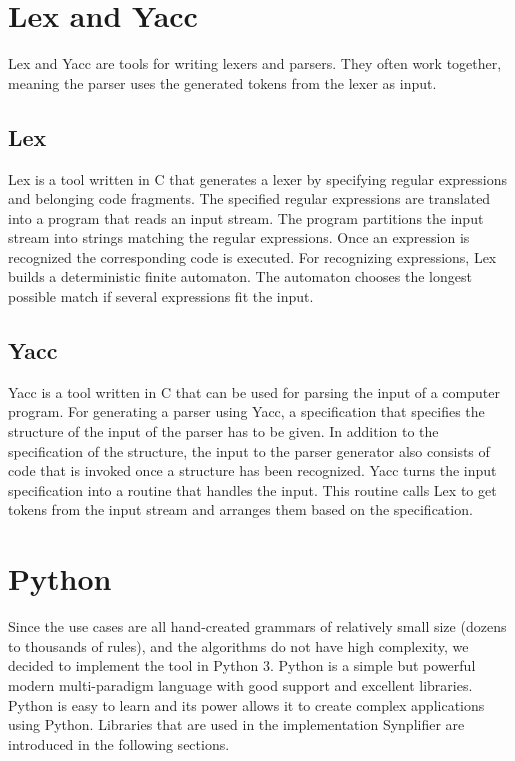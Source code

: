 \section{Lex and Yacc}\label{sec:BackgroundLexYacc}

Lex and Yacc are tools for writing lexers and parsers. They often work together, meaning the parser uses the generated tokens from the lexer as input.

\subsection{Lex}\label{sec:BackgroundLex}

Lex is a tool written in C that generates a lexer by specifying regular expressions and belonging code fragments. The specified regular expressions are translated into a program that reads an input stream. The program partitions the input stream into strings matching the regular expressions. Once an expression is recognized the corresponding code is executed. For recognizing expressions, Lex builds a deterministic finite automaton. The automaton chooses the longest possible match if several expressions fit the input. \cite{Lex}

\subsection{Yacc}\label{sec:BackgroundYacc}
Yacc is a tool written in C that can be used for parsing the input of a computer program. 
For generating a parser using Yacc, a specification that specifies the structure of the input of the parser has to be given. In addition to the specification of the structure, the input to the parser generator also consists of code that is invoked once a structure has been recognized. 
Yacc turns the input specification into a routine that handles the input. This routine calls Lex to get tokens from the input stream and arranges them based on the specification. \cite{Yacc}

\section{Python}\label{sec:BackgroundPython}

Since the use cases are all hand-created grammars of relatively small size (dozens to thousands of rules), and the algorithms do not have high complexity, we decided to implement the tool in Python 3. 
Python is a simple but powerful modern multi-paradigm language with good support and excellent libraries.
Python is easy to learn and its power allows it to create complex applications using Python.
Libraries that are used in the implementation \ac{Synplifier} are introduced in the following sections.


